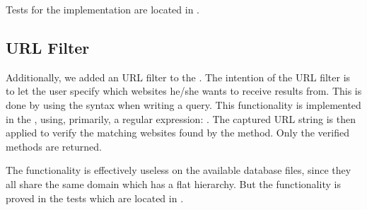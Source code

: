 Tests for the implementation are located in .

\subsection{URL Filter}
Additionally, we added an URL filter to the . The intention of the URL filter is to let the user specify which websites he/she wants to receive results from. This is done by using the syntax  when writing a query. This functionality is implemented in the , using, primarily, a regular expression: . The captured URL string is then applied to verify the matching websites found by the method. Only the verified methods are returned.

The functionality is effectively useless on the available database files, since they all share the same domain which has a flat hierarchy. But the functionality is proved in the tests which are located in .
